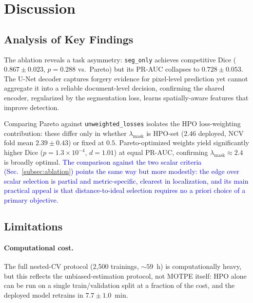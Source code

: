 \documentclass[final,5p,times,twocolumn,number]{elsarticle}
\newcommand{\rev}[1]{#1}
\newcommand{\revB}[1]{\textcolor{blue}{#1}}
\begin{document}

\section{Discussion}
\label{sec:discussion}

\subsection{Analysis of Key Findings}

The ablation reveals a task asymmetry: \texttt{seg\_only} achieves competitive
Dice ($0.867 \pm 0.023$, $p = 0.288$ vs.\ Pareto) but its PR-AUC collapses to
$0.728 \pm 0.053$. The U-Net decoder captures forgery evidence for pixel-level
prediction yet cannot aggregate it into a reliable document-level decision,
confirming the shared encoder, regularized by the segmentation loss, learns
spatially-aware features that improve detection.

Comparing Pareto against \texttt{unweighted\_losses} isolates the HPO
loss-weighting contribution: these differ only in whether $\lambda_{\text{mask}}$
is HPO-set \rev{($2.46$ deployed, NCV fold mean $2.39 \pm 0.43$)} or fixed at
$0.5$. Pareto-optimized weights yield significantly higher Dice ($p =
1.3 \times 10^{-4}$, $d = 1.01$) at equal PR-AUC, confirming
$\lambda_{\text{mask}} \approx 2.4$ is broadly optimal. \revB{The comparison against the two scalar criteria
(Sec.~\ref{subsec:ablation}) points the same way but more modestly: the edge over
scalar selection is partial and metric-specific, clearest in localization, and its
main practical appeal is that distance-to-ideal selection requires no a priori
choice of a primary objective.}

\subsection{Limitations}

\paragraph{\rev{Computational cost.}}
\rev{The full nested-CV protocol (2{,}500 trainings, ${\sim}59$~h) is computationally
heavy, but this reflects the unbiased-estimation protocol, not MOTPE itself:
HPO alone can be run on a single train/validation split at a fraction of the
cost, and the deployed model retrains in $7.7 \pm 1.0$~min.}
\end{document}
